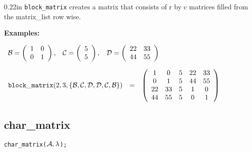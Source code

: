 \begin{addtolength}{\leftskip}{0.22in}
{\tt block\_matrix} creates a matrix that consists of r by c matrices
filled from the matrix\_list row wise.

\end{addtolength}


{\bf Examples:}

\begin{flushleft}
\hspace*{0.1in}
\begin{math}
\begin{array}{ccc}
{\cal B} = \left( \begin{array}{cc} 1 & 0 \\ 0 & 1
\end{array} \right), &
{\cal C} = \left( \begin{array}{c} 5 \\ 5
\end{array} \right), &
{\cal D} = \left( \begin{array}{cc} 22 & 33 \\ 44 & 55
\end{array} \right)
\end{array}
\end{math}
\end{flushleft}

\vspace*{0.175in}

\begin{flushleft}
\hspace*{0.1in}
\begin{math}
\begin{array}{ccc}
{\tt block\_matrix}(2,3,\{{\cal B,C,D,D,C,B}\}) & = &
\left( \begin{array}{ccccc} 1 & 0 & 5 & 22 & 33 \\ 0 & 1 & 5 & 44 & 55
\\
22 & 33 & 5 & 1 & 0 \\ 44 & 55 & 5 & 0 & 1
\end{array} \right)
\end{array}
\end{math}
\end{flushleft}


\subsection{char\_matrix}


\hspace*{0.175in} {\tt char\_matrix(${\cal A},\lambda$);}

